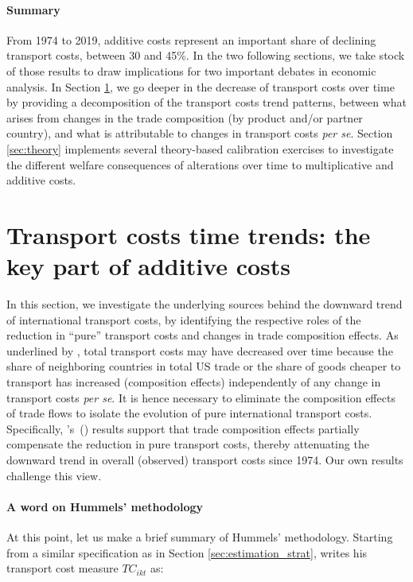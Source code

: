 \documentclass[a4paper,11pt]{article}
\newcommand\cites[1]{\citeauthor{#1}'s\ (\citeyear{#1})}
\begin{document}
\paragraph{Summary}
From 1974 to 2019, additive costs represent an important share of declining transport costs, between 30 and 45\%. In the two following sections, we take stock of those results to draw implications for two important debates in economic analysis. In Section \ref{sec:results_trends}, we go deeper in the decrease of transport costs over time by providing a decomposition of the transport costs trend patterns, between what arises from changes in the trade composition (by product and/or partner country), and what is attributable to changes in transport costs \emph{per se}. Section \ref{sec:theory} implements several theory-based calibration exercises to investigate the different welfare consequences of alterations over time to multiplicative and additive costs.


\section{Transport costs time trends: the key part of additive costs}\label{sec:results_trends}

In this section, we investigate the underlying sources behind the downward trend of international transport costs, by identifying the respective roles of the reduction in ``pure'' transport costs and changes in trade composition effects. As underlined by \cite{hummels2007}, total transport costs may have decreased over time because the share of neighboring countries in total US trade or the share of goods cheaper to transport has increased (composition effects) independently of any change in transport costs \textit{per se}. It is hence necessary to eliminate the composition effects of trade flows to isolate the evolution of pure international transport costs. Specifically, \cites{hummels2007} results support that trade composition effects partially compensate the reduction in pure transport costs, thereby attenuating the downward trend in overall (observed) transport costs since 1974. Our own results challenge this view.

\paragraph{A word on Hummels' methodology} At this point, let us make a brief summary of Hummels' methodology\nocite{hummels2007}.
Starting from a similar specification as in Section \ref{sec:estimation_strat}, \cite{hummels2007} writes his transport cost measure $TC_{ikt}$ as:
\end{document}
